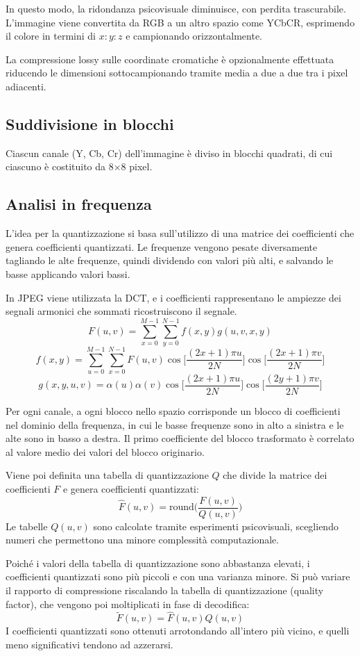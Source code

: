 In questo modo, la ridondanza psicovisuale diminuisce, con perdita trascurabile. L'immagine viene convertita da RGB a un altro spazio come YCbCR, esprimendo il colore in termini di $x : y : z$ e campionando orizzontalmente.

La compressione lossy sulle coordinate cromatiche è opzionalmente effettuata riducendo le dimensioni sottocampionando tramite media a due a due tra i pixel adiacenti. 

\subsection{Suddivisione in blocchi}
Ciascun canale (Y, Cb, Cr) dell'immagine è diviso in blocchi quadrati, di cui ciascuno è costituito da 8$\times$8 pixel. 

\subsection{Analisi in frequenza}
L'idea per la quantizzazione si basa sull'utilizzo di una matrice dei coefficienti che genera coefficienti quantizzati. Le frequenze vengono pesate diversamente tagliando le alte frequenze, quindi dividendo con valori più alti, e salvando le basse applicando valori bassi.

In JPEG viene utilizzata la DCT, e i coefficienti rappresentano le ampiezze dei segnali armonici che sommati ricostruiscono il segnale.
$$F(u, v) = \sum_{x=0}^{M-1}\sum_{y=0}^{N-1} f(x, y) g(u, v, x, y)$$
$$f(x, y) = \sum_{u=0}^{M-1}\sum_{x=0}^{N-1} F(u, v) \cos\bigg[\frac{(2x + 1)\pi u}{2N}\bigg] \cos\bigg[\frac{(2x + 1)\pi v}{2N}\bigg]$$
$$g(x, y, u, v) = \alpha(u) \alpha(v) \cos\bigg[\frac{(2x + 1)\pi u}{2N}\bigg] \cos\bigg[\frac{(2y + 1)\pi v}{2N}\bigg]$$

Per ogni canale, a ogni blocco nello spazio corrisponde un blocco di coefficienti nel dominio della frequenza, in cui le basse frequenze sono in alto a sinistra e le alte sono in basso a destra. Il primo coefficiente del blocco trasformato è correlato al valore medio dei valori del blocco originario.

Viene poi definita una tabella di quantizzazione $Q$ che divide la matrice dei coefficienti $F$ e genera coefficienti quantizzati:
$$\hat{F}(u, v) = \text{round} \bigg(\frac{F(u, v)}{Q(u, v)}\bigg)$$
Le tabelle $Q(u, v)$ sono calcolate tramite esperimenti psicovisuali, scegliendo numeri che permettono una minore complessità computazionale. 

Poiché i valori della tabella di quantizzazione sono abbastanza elevati, i coefficienti quantizzati sono più piccoli e con una varianza minore. Si può variare il rapporto di compressione riscalando la tabella di quantizzazione (quality factor), che vengono poi moltiplicati in fase di decodifica:
$$ \tilde{F}(u, v) = \hat{F}(u, v) Q(u, v)$$
I coefficienti quantizzati sono ottenuti arrotondando all'intero più vicino, e quelli meno significativi tendono ad azzerarsi. 

